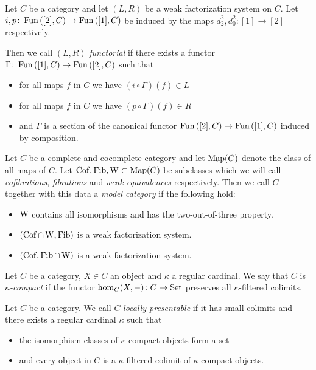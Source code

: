 \begin{definition}
    Let $C$ be a category and let $(L,R)$ be a weak factorization system on $C$.
    Let $i,p\colon\operatorname{Fun}\left([2],C\right)\to\operatorname{Fun}\left([1],C\right)$ be induced by the maps $d_2^2,d_0^2\colon [1]\to[2]$ respectively.

    Then we call $(L,R)$ \emph{functorial} if there exists a functor $\Gamma\colon\operatorname{Fun}\left([1],C\right)\to\operatorname{Fun}\left([2],C\right)$ such that
    \begin{itemize}
        \item for all maps $f$ in $C$ we have $(i\circ\Gamma)(f)\in L$
        \item for all maps $f$ in $C$ we have $(p\circ\Gamma)(f)\in R$
        \item and $\Gamma$ is a section of the canonical functor $\operatorname{Fun}\left([2],C\right)\to\operatorname{Fun}\left([1],C\right)$ induced by composition.
    \end{itemize}
\end{definition}
\begin{definition}
    Let $C$ be a complete and cocomplete category and let $\operatorname{Map}(C)$ denote the class of all maps of $C$.
    Let $\operatorname{Cof},\operatorname{Fib},\operatorname{W}\subset\operatorname{Map}(C)$ be subclasses which we will call \emph{cofibrations}, \emph{fibrations} and \emph{weak equivalences} respectively.
    Then we call $C$ together with this data a \emph{model category} if the following hold:
    \begin{itemize}
        \item $\operatorname{W}$ contains all isomorphisms and has the two-out-of-three property.
        \item $(\operatorname{Cof}\cap\operatorname{W},\operatorname{Fib})$ is a weak factorization system.
        \item $(\operatorname{Cof},\operatorname{Fib}\cap\operatorname{W})$ is a weak factorization system.
    \end{itemize}
\end{definition}
\begin{definition}
    Let $C$ be a category, $X\in C$ an object and $\kappa$ a regular cardinal.
    We say that $C$ is \emph{$\kappa$-compact} if the functor $\hom_C(X,-)\colon C\to\operatorname{Set}$ preserves all $\kappa$-filtered colimits.
\end{definition}
\begin{definition} %
    Let $C$ be a category.
    We call $C$ \emph{locally presentable} if it has small colimits and there exists a regular cardinal $\kappa$ such that
    \begin{itemize}
        \item the isomorphism classes of $\kappa$-compact objects form a set
        \item and every object in $C$ is a $\kappa$-filtered colimit of $\kappa$-compact objects.
    \end{itemize}
\end{definition}
